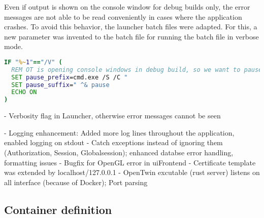 Even if output is shown on the console window for debug builds only, the error messages are not able to be read conveniently in cases where the application crashes. To avoid this behavior, the launcher batch files were adapted. For this, a new parameter was invented to the batch file for running the batch file in verbose mode.

\begin{lstlisting}[label=lst:launcher_extension.parameter_validation.after, caption={Additional command exntension for preventing close of window after termination (/Microservices/Launcher/OpenTwin\_session.bat)}, language=cmd, firstnumber=2]
IF "%~1"=="/V" (
  REM OT is opening console windows in debug build, so we want to pause them at the end
  SET pause_prefix=cmd.exe /S /C "
  SET pause_suffix=" ^& pause
  ECHO ON
)
\end{lstlisting}


- Verbosity flag in Launcher, otherwise error messages cannot be seen


- Logging enhancement: Added more log lines throughout the application, enabled logging on stdout
- Catch exceptions instead of ignoring them (Authorization, Session, Globalsession); enhanced databse error handling, formatting issues
- Bugfix for OpenGL error in uiFrontend
- Certificate template was extended by localhost/127.0.0.1
- OpenTwin excutable (rust server) listens on all interface (because of Docker); Port parsing


\subsection{Container definition}




